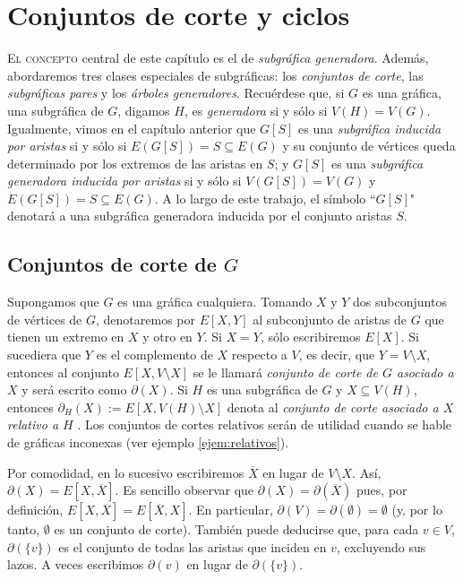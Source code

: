 \chapter{Conjuntos de corte y ciclos}

\lettrine[lines=5] {\initfamily \selectfont E} {l concepto} central de este capítulo es el de \textit{subgráfica generadora}. Además, abordaremos tres clases especiales de subgráficas: los \textit{conjuntos de corte}, las \textit{subgráficas pares} y los \textit{árboles generadores}. Recuérdese que, si $G$ es una gráfica, una subgráfica de $G$, digamos $H$, es \textit{generadora} si y sólo si $V(H)=V(G)$. Igualmente, vimos en el capítulo anterior que $G[S]$ es una \textit{subgráfica inducida por aristas} si y sólo si $E(G[S]) = S\subseteq E(G)$ y su conjunto de vértices queda determinado por los extremos de las aristas en $S$; y $G[S]$ es una \textit{subgráfica generadora inducida por aristas} si y sólo si $V(G[S]) = V(G)$ y $E(G[S]) = S\subseteq E(G)$. A lo largo de este trabajo, el símbolo ``$G[S]$" denotará a una subgráfica generadora inducida por el conjunto aristas $S$. 



\section{Conjuntos de corte de $G$}

Supongamos que $G$ es una gráfica cualquiera. Tomando $X$ y $Y$ dos subconjuntos de vértices de $G$, denotaremos por $E[X,Y]$ al subconjunto de aristas de $G$ que tienen un extremo en $X$ y otro en $Y$. Si $X = Y$, sólo escribiremos $E[X]$. Si sucediera que $Y$ es el complemento de $X$ respecto a $V$, es decir, que $Y=V \setminus X$, entonces al conjunto $E[X, V \setminus X]$ se le llamará \textit{conjunto de corte de $G$ asociado a $X$}  y será escrito como $\partial(X)$. Si $H$ es una subgráfica de $G$ y $X \subseteq V(H)$, entonces $\partial_{H}(X):= E[X, V(H)\setminus X]$ denota al \textit{conjunto de corte asociado a $X$ relativo a $H$}  . Los conjuntos de cortes relativos serán de utilidad cuando se hable de gráficas inconexas (ver ejemplo \ref{ejem:relativos}).

Por comodidad, en lo sucesivo escribiremos $\overline{X}$ en lugar de $V \setminus X$. Así, $\partial(X) = E[X,\overline{X}]$. Es sencillo observar que $\partial(X) = \partial(\overline{X})$ pues, por definición, $E[X,\overline{X}] = E[\overline{X},X]$. En particular, $\partial(V)=\partial(\emptyset) = \emptyset$ (y, por lo tanto, $\emptyset$ es un conjunto de corte). También puede deducirse que, para cada  $v \in V$, $\partial(\{v\})$ es el conjunto de todas las aristas que inciden en $v$, excluyendo sus lazos.  A veces escribimos $\partial(v)$ en lugar de $\partial(\{v\})$.

